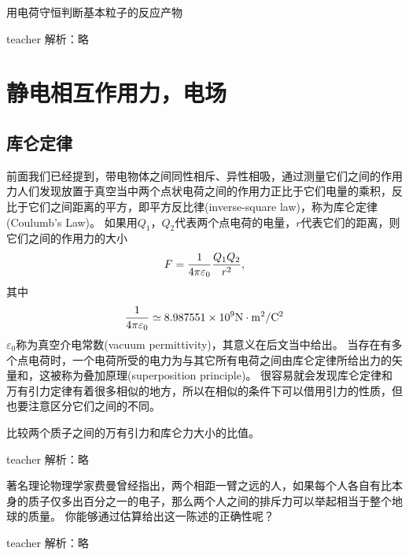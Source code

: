 \begin{example}
用电荷守恒判断基本粒子的反应产物
\begin{taggedblock}{teacher}
\newline
解析：略
\end{taggedblock}
\end{example}

\section{静电相互作用力，电场}
\subsection{库仑定律}

前面我们已经提到，带电物体之间同性相斥、异性相吸，通过测量它们之间的作用力人们发现放置于真空当中两个点状电荷之间的作用力正比于它们电量的乘积，反比于它们之间距离的平方，即{\heiti 平方反比律}(inverse-square law)，称为{\heiti 库仑定律}(Coulumb's Law)。
如果用$Q_1$，$Q_2$代表两个点电荷的电量，$r$代表它们的距离，则它们之间的作用力的大小
\begin{equation}\label{eqn： coulomb's law}
F = \frac{1}{4\pi\varepsilon_0} \frac{Q_1Q_2}{r^2},
\end{equation}
其中
\begin{equation}
\frac{1}{4\pi\varepsilon_0} \simeq 8.987551\times 10^{9}{\rm{N\cdot m^2/C^2}}
\end{equation}
$\varepsilon_0$称为{\heiti 真空介电常数}(vacuum permittivity)，其意义在后文当中给出。
当存在有多个点电荷时，一个电荷所受的电力为与其它所有电荷之间由库仑定律所给出力的矢量和，这被称为{\heiti 叠加原理}(superposition principle)。
很容易就会发现库仑定律和万有引力定律有着很多相似的地方，所以在相似的条件下可以借用引力的性质，但也要注意区分它们之间的不同。

\begin{example}
比较两个质子之间的万有引力和库仑力大小的比值。
\begin{taggedblock}{teacher}
\newline
解析：略
\end{taggedblock}
\end{example}

\begin{example}
著名理论物理学家费曼曾经指出，两个相距一臂之远的人，如果每个人各自有比本身的质子仅多出百分之一的电子，那么两个人之间的排斥力可以举起相当于整个地球的质量。
你能够通过估算给出这一陈述的正确性呢？
\begin{taggedblock}{teacher}
\newline
解析：略
\end{taggedblock}
\end{example}

